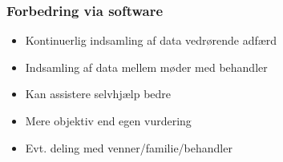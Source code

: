 \begin{frame}
\frametitle{Forbedring via software}

\begin{itemize}
\item Kontinuerlig indsamling af data vedrørende adfærd
\item Indsamling af data mellem møder med behandler
\item Kan assistere selvhjælp bedre
\item Mere objektiv end egen vurdering
\item Evt. deling med venner/familie/behandler
\end{itemize}

\end{frame}
